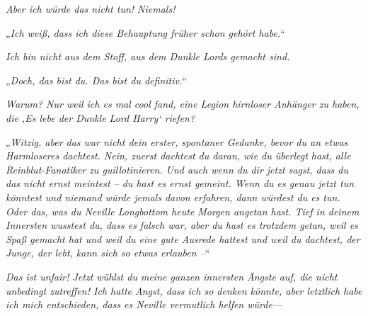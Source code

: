 \emph{Aber ich würde das nicht tun! Niemals! }

„\emph{Ich weiß, dass ich diese Behauptung früher schon gehört habe.}“

\emph{Ich bin nicht aus dem Stoff, aus dem Dunkle Lords gemacht sind. }

„\emph{Doch, das bist du. Das bist du \emph{definitiv}.}“

\emph{Warum? Nur weil ich es mal cool fand, eine Legion hirnloser Anhänger zu haben, die ‚Es lebe der Dunkle Lord Harry‘ riefen? }

„\emph{Witzig, aber das war nicht dein erster, spontaner Gedanke, bevor du an etwas Harmloseres dachtest. Nein, zuerst dachtest du daran, wie du überlegt hast, alle Reinblut-Fanatiker zu guillotinieren. Und auch wenn du dir jetzt sagst, dass du das nicht ernst meintest – du hast es ernst gemeint. Wenn du es genau jetzt tun könntest und niemand würde jemals davon erfahren, dann würdest du es tun. Oder das, was du Neville Longbottom heute Morgen angetan hast. Tief in deinem Innersten \emph{wusstest} du, dass es falsch war, aber du hast es \emph{trotzdem} getan, weil es \emph{Spaß} gemacht hat und weil du eine \emph{gute Ausrede} hattest und weil du dachtest, der Junge, der lebt, kann sich so etwas erlauben –}“

\emph{Das ist unfair! Jetzt wühlst du meine ganzen innersten Ängste auf, die nicht unbedingt zutreffen! Ich \emph{hatte Angst}, dass ich so denken \emph{könnte}, aber letztlich habe ich mich entschieden, dass es Neville vermutlich \emph{helfen} würde—}

